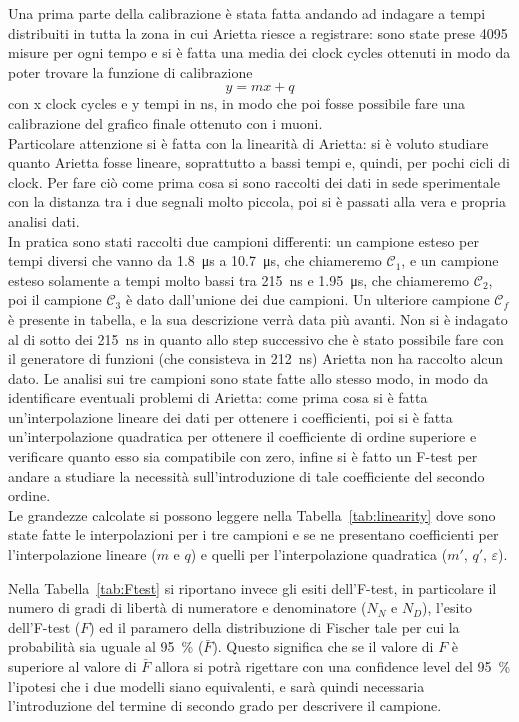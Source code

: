 Una prima parte della calibrazione è stata fatta andando ad indagare a tempi distribuiti in tutta la zona in cui Arietta riesce a registrare: sono state prese 4095 misure per ogni tempo e si è fatta una media dei clock cycles ottenuti in modo da poter trovare la funzione di calibrazione
$$y = mx +q$$
con x clock cycles e y tempi in ns, in modo che poi fosse possibile fare una calibrazione del grafico finale ottenuto con i muoni.\\

Particolare attenzione si è fatta con la linearità di Arietta: si è voluto studiare quanto Arietta fosse lineare, soprattutto a bassi tempi e, quindi, per pochi cicli di clock. Per fare ciò come prima cosa si sono raccolti dei dati in sede sperimentale con la distanza tra i due segnali molto piccola, poi si è passati alla vera e propria analisi dati.\\

In pratica sono stati raccolti due campioni differenti: un campione esteso per tempi diversi che vanno da \SI{1.8}{\micro\s} a \SI{10.7}{\micro\s}, che chiameremo $\mathcal{C}_1$, e un campione esteso solamente a tempi molto bassi tra \SI{215}{\nano\s} e \SI{1.95}{\micro\s}, che chiameremo $\mathcal{C}_2$, poi il campione $\mathcal{C}_3$ è dato dall'unione dei due campioni. 
Un ulteriore campione $\mathcal{C}_f$ è presente in tabella, e la sua descrizione verrà data più avanti. 
Non si è indagato al di sotto dei \SI{215}{\ns} in quanto allo step successivo che è stato possibile fare con il generatore di funzioni (che consisteva in \SI{212}{\ns}) Arietta non ha raccolto alcun dato. 
Le analisi sui tre campioni sono state fatte allo stesso modo, in modo da identificare eventuali problemi di Arietta: come prima cosa si è fatta un'interpolazione lineare dei dati per ottenere i coefficienti, poi si è fatta un'interpolazione quadratica per ottenere il coefficiente di ordine superiore e verificare quanto esso sia compatibile con zero, infine si è fatto un F-test per andare a studiare la necessità sull'introduzione di tale coefficiente del secondo ordine.\\

Le grandezze calcolate si possono leggere nella Tabella~\ref{tab:linearity} dove sono state fatte le interpolazioni per i tre campioni e se ne presentano coefficienti per l'interpolazione lineare ($m$ e $q$) e quelli per l'interpolazione quadratica ($m'$, $q'$, $\varepsilon$).\\

Nella Tabella~\ref{tab:Ftest} si riportano invece gli esiti dell'F-test, in particolare il numero di gradi di libertà di numeratore e denominatore ($N_N$ e $N_D$), l'esito dell'F-test ($F$) ed il paramero della distribuzione di Fischer tale per cui la probabilità sia uguale al \SI{95}{\percent} ($\bar{F}$). 
Questo  significa che se il valore di $F$ è superiore al valore di $\bar{F}$ allora si potrà rigettare con una confidence level del \SI{95}{\percent} l'ipotesi che i due modelli siano equivalenti, e  sarà quindi necessaria l'introduzione del termine di secondo grado per descrivere il campione.\\

